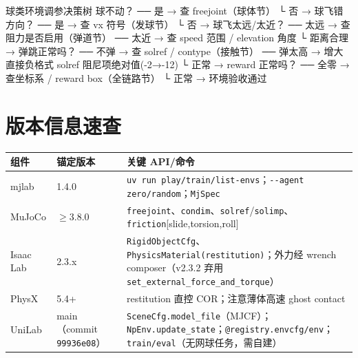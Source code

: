 \begin{codebox}[text]{球类环境调参决策树}
球不动？ ── 是 → 查 freejoint（球体节）
        └ 否 → 球飞错方向？
              ── 是 → 查 vx 符号（发球节）
              └ 否 → 球飞太远/太近？
                    ── 太远 → 查阻力是否启用（弹道节）
                    ── 太近 → 查 speed 范围 / elevation 角度
                    └ 距离合理 → 弹跳正常吗？
                          ── 不弹 → 查 solref / contype（接触节）
                          ── 弹太高 → 增大直接负格式 solref 阻尼项绝对值(-2→-12)
                          └ 正常 → reward 正常吗？
                                ── 全零 → 查坐标系 / reward box（全链路节）
                                └ 正常 → 环境验收通过
\end{codebox}

\section*{版本信息速查}
\label{sec:rlmc-tennis-versions}

\begin{center}
\small
\begin{tabular}{@{}lll@{}}
\toprule
组件 & 锚定版本 & 关键 API/命令 \\
\midrule
mjlab & 1.4.0 & \verb|uv run play/train/list-envs|；\verb|--agent zero/random|；\verb|MjSpec| \\
MuJoCo & $\ge3.8.0$ & \verb|freejoint|、\verb|condim|、\verb|solref|/\verb|solimp|、\verb|friction|[slide,torsion,roll] \\
Isaac Lab & 2.3.x & \verb|RigidObjectCfg|、\verb|PhysicsMaterial(restitution)|；外力经 wrench composer（v2.3.2 弃用 \verb|set_external_force_and_torque|） \\
PhysX & 5.4+ & restitution 直控 COR；注意薄体高速 ghost contact \\
UniLab & main（commit \texttt{99936e08}） & \verb|SceneCfg.model_file|（MJCF）；\verb|NpEnv.update_state|；\verb|@registry.envcfg/env|；\verb|train/eval|（无网球任务，需自建） \\
\bottomrule
\end{tabular}
\end{center}

